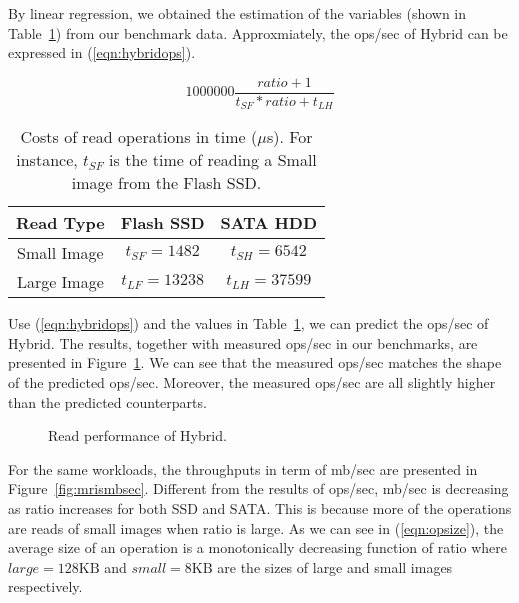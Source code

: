 By linear regression, we obtained the estimation of the variables
(shown in Table~\ref{tbl:variable}) from our benchmark data.
Approxmiately, the ops/sec of Hybrid can be expressed in
(\ref{eqn:hybridops}).

\begin{equation}
\label{eqn:hybridops}
    1000000 \frac{ratio + 1}{t_{SF} * ratio + t_{LH}}
\end{equation}

\begin{table}[tc]
{\centering \footnotesize
\begin{tabular}{c|c|c}
\hline 
  Read Type & Flash SSD & SATA HDD \\ \hline
  Small Image & $t_{SF} = 1482$ & $t_{SH} = 6542$ \\ 
  Large Image & $t_{LF} = 13238$ & $t_{LH} = 37599$ \\ \hline
\end{tabular}
 \caption{Costs of read operations in time ($\mu$s). For instance,
$t_{SF}$ is the time of reading a Small image from the Flash SSD.}
\label{tbl:variable}
}
\end{table}

Use (\ref{eqn:hybridops}) and the values in Table~\ref{tbl:variable},
we can predict the ops/sec of Hybrid. The results, together with
measured ops/sec in our benchmarks, are presented in
Figure~\ref{fig:opspred}. We can see that the measured ops/sec
matches the shape of the predicted ops/sec. Moreover, the measured
ops/sec are all slightly higher than the predicted counterparts.


\begin{figure}[t]
\begin{centering}
\caption{Read performance of Hybrid.}
\label{fig:opspred}
\end{centering}
\end{figure}

For the same workloads, the throughputs in term of mb/sec are
presented in Figure~\ref{fig:mrismbsec}. Different from the results of
ops/sec, mb/sec is decreasing as ratio increases for both SSD and
SATA. This is because more of the operations are reads of small images
when ratio is large. As we can see in (\ref{eqn:opsize}), the average
size of an operation is a monotonically decreasing function of ratio
where $large = 128\mbox{KB}$ and $small = 8\mbox{KB}$ are the sizes of
large and small images respectively.

